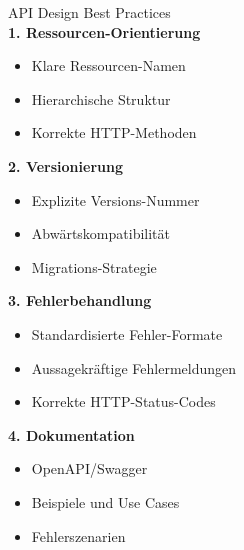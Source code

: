 \begin{KR}{API Design Best Practices}\\
\textbf{1. Ressourcen-Orientierung}
\begin{itemize}
    \item Klare Ressourcen-Namen
    \item Hierarchische Struktur
    \item Korrekte HTTP-Methoden
\end{itemize}

\textbf{2. Versionierung}
\begin{itemize}
    \item Explizite Versions-Nummer
    \item Abwärtskompatibilität
    \item Migrations-Strategie
\end{itemize}

\textbf{3. Fehlerbehandlung}
\begin{itemize}
    \item Standardisierte Fehler-Formate
    \item Aussagekräftige Fehlermeldungen
    \item Korrekte HTTP-Status-Codes
\end{itemize}

\textbf{4. Dokumentation}
\begin{itemize}
    \item OpenAPI/Swagger
    \item Beispiele und Use Cases
    \item Fehlerszenarien
\end{itemize}
\end{KR}

